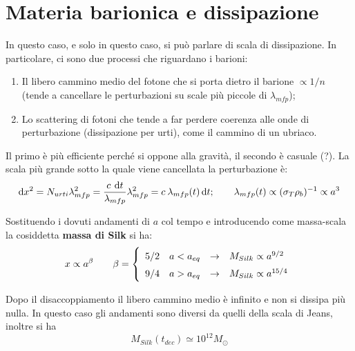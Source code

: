 \newpage
\section{Materia barionica e dissipazione}
In questo caso, e solo in questo caso, si può parlare di scala di dissipazione. In particolare, ci sono due processi che riguardano i barioni: 
\begin{enumerate}
    \item Il libero cammino medio del fotone che si porta dietro il barione $\propto 1/n$ (tende a cancellare le perturbazioni su scale più piccole di $\lambda_{mfp}$);
    \item Lo scattering di fotoni che tende a far perdere coerenza alle onde di perturbazione (dissipazione per urti), come il cammino di un ubriaco.
\end{enumerate}
Il primo è più efficiente perché si oppone alla gravità, il secondo è casuale (?). La scala più grande sotto la quale viene cancellata la perturbazione è:
\begin{equation*}
   \operatorname{d}\!{x^2} = N_{urti}\lambda_{mfp}^2 = \frac{c\: \operatorname{d}\!{t}}{\lambda_{mfp}}\lambda_{mfp}^2  = c\: \lambda_{mfp}(t)\operatorname{d}\!{t}; \qquad \lambda_{mfp}(t)\propto (\sigma_T\rho_b)^{-1}\propto a^{3}
\end{equation*}

Sostituendo i dovuti andamenti di $a$ col tempo e introducendo come massa-scala la cosiddetta \textbf{massa di Silk} si ha:
\begin{equation}x \propto a^\beta \qquad \beta=\left\{
    \def\arraystretch{1.5}
        \begin{array}{llll}
        5/2 & a<a_{eq} & \rightarrow & M_{Silk}\propto a^{9/2} \\
        9/4 & a>a_{eq} & \rightarrow & M_{Silk}\propto a^{15/4}
    \end{array}\right.
\end{equation}

Dopo il disaccoppiamento il libero cammino medio è infinito e non si dissipa più nulla. In questo caso gli andamenti sono diversi da quelli della scala di Jeans, inoltre si ha 
\begin{equation}
    M_{Silk}(t_{dec})\simeq 10^{12}M_\odot
\end{equation}

